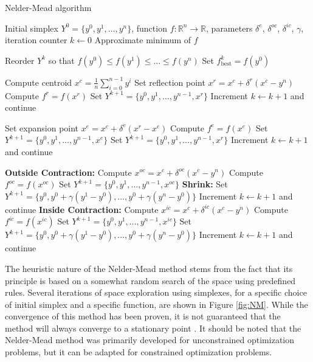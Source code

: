 \begin{algorithm}
	\caption{Nelder-Mead algorithm}\label{neldermead}
	\begin{algorithmic}[1]
		\Require Initial simplex $Y^0 = \{y^0, y^1, \dots, y^n\}$, function $f: \mathbb{R}^n \to \mathbb{R}$, parameters $\delta^e$, $\delta^{oc}$, $\delta^{ic}$, $\gamma$, iteration counter $k \gets 0$
		\Ensure Approximate minimum of $f$
		
		\State Reorder $Y^k$ so that $f(y^0) \leq f(y^1) \leq \dots \leq f(y^n)$
		\State Set $f^k_{\text{best}} = f(y^0)$
		
		\State Compute centroid $x^c = \frac{1}{n} \sum_{i=0}^{n-1} y^i$
		\State Set reflection point $x^r = x^c + \delta^r (x^c - y^n)$
		\State Compute $f^r = f(x^r)$
		\State Set $Y^{k+1} = \{y^0, y^1, \dots, y^{n-1}, x^r\}$
		\State Increment $k \gets k+1$ and continue
		\EndIf
		
		\State Set expansion point $x^e = x^c + \delta^e (x^r - x^c)$
		\State Compute $f^e = f(x^e)$
		\State Set $Y^{k+1} = \{y^0, y^1, \dots, y^{n-1}, x^e\}$
		\Else
		\State Set $Y^{k+1} = \{y^0, y^1, \dots, y^{n-1}, x^r\}$
		\EndIf
		\State Increment $k \gets k+1$ and continue
		\EndIf
		
		\State \textbf{Outside Contraction:} Compute $x^{oc} = x^c + \delta^{oc}(x^c - y^n)$
		\State Compute $f^{oc} = f(x^{oc})$
		\State Set $Y^{k+1} = \{y^0, y^1, \dots, y^{n-1}, x^{oc}\}$
		\Else
		\State \textbf{Shrink:} Set $Y^{k+1} = \{y^0, y^0 + \gamma(y^1 - y^0), \dots, y^0 + \gamma(y^n - y^0)\}$
		\EndIf
		\State Increment $k \gets k+1$ and continue
		\Else
		\State \textbf{Inside Contraction:} Compute $x^{ic} = x^c + \delta^{ic}(x^c - y^n)$
		\State Compute $f^{ic} = f(x^{ic})$
		\State Set $Y^{k+1} = \{y^0, y^1, \dots, y^{n-1}, x^{ic}\}$
		\Else
		\State Set $Y^{k+1} = \{y^0, y^0 + \gamma(y^1 - y^0), \dots, y^0 + \gamma(y^n - y^0)\}$
		\EndIf
		\State Increment $k \gets k+1$ and continue
		\EndIf
		\EndWhile
		\EndProcedure
	\end{algorithmic}
\end{algorithm}


The heuristic nature of the Nelder-Mead method stems from the fact that its principle is based on a somewhat random search of the space using predefined rules. Several iterations of space exploration using simplexes, for a specific choice of initial simplex and a specific function, are shown in Figure \ref{fig:NM}. While the convergence of this method has been proven, it is not guaranteed that the method will always converge to a stationary point \cite{BBO-textbook}. It should be noted that the Nelder-Mead method was primarily developed for unconstrained optimization problems, but it can be adapted for constrained optimization problems.


